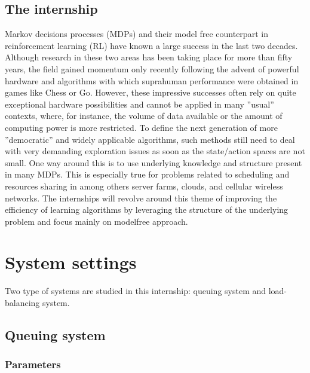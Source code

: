 \documentclass[
  a4paper, xcolor = usenames,dvipsnames]{article}
\begin{document}
\hypertarget{the-internship}{%
\subsection{The internship}\label{the-internship}}

Markov decisions processes (MDPs) and their model free counterpart in reinforcement learning (RL) have known a large success in the last two decades. Although research in these two areas has been taking place for more than fifty years, the field gained momentum only recently following the advent of powerful hardware and algorithms with which supra­human performance were obtained in games like Chess or Go. However, these impressive successes often rely on quite exceptional hardware possibilities and cannot be applied in many ''usual'' contexts, where, for instance, the volume of data available or the amount of computing power is more restricted. To define the next generation of more ''democratic'' and widely applicable algorithms, such methods still need to deal with very demanding exploration issues as soon as the state/action spaces are not small. One way around this is to use underlying knowledge and structure present in many MDPs. This is especially true for problems related to scheduling and resources sharing in among others server farms, clouds, and cellular wireless networks. The internships will revolve around this theme of improving the efficiency of learning algorithms by leveraging the structure of the underlying problem and focus mainly on model­free approach.

\hypertarget{system-settings}{%
\section{System settings}\label{system-settings}}

Two type of systems are studied in this internship: queuing system and load-balancing system.

\hypertarget{queuing-system}{%
\subsection{Queuing system}\label{queuing-system}}

\hypertarget{parameters}{%
\subsubsection{Parameters}\label{parameters}}
\end{document}
